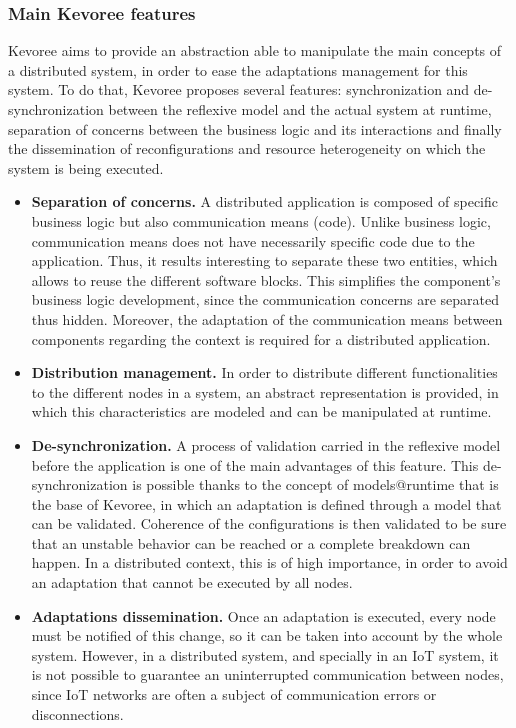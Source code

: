 \subsubsection{Main Kevoree features}
Kevoree aims to provide an abstraction able to manipulate the main concepts of a distributed system, in order to ease the adaptations management for this system.
To do that, Kevoree proposes several features: synchronization and de-synchronization between the reflexive model and the actual system at runtime, separation of concerns between the business logic and its interactions and finally the dissemination of reconfigurations and resource heterogeneity on which the system is being executed.
\begin{itemize}
	\item \textbf{Separation of concerns.} A distributed application is composed of specific business logic but also communication means (code).
	Unlike business logic, communication means does not have necessarily specific code due to the application.
	Thus, it results interesting to separate these two entities, which allows to reuse the different software blocks.
	This simplifies the component's business logic development, since the communication concerns are separated thus hidden.
	Moreover, the adaptation of the communication means between components regarding the context is required for a distributed application.
	\item \textbf{Distribution management.} In order to distribute different functionalities to the different nodes in a system, an abstract representation is provided, in which this characteristics are modeled and can be manipulated at runtime.
	\item \textbf{De-synchronization.} A process of validation carried in the reflexive model before the application is one of the main advantages of this feature.
	This de-synchronization is possible thanks to the concept of models@runtime that is the base of Kevoree, in which an adaptation is defined through a model that can be validated.
	Coherence of the configurations is then validated to be sure that an unstable behavior can be reached or a complete breakdown can happen.
	In a distributed context, this is of high importance, in order to avoid an adaptation that cannot be executed by all nodes.
	\item \textbf{Adaptations dissemination.} Once an adaptation is executed, every node must be notified of this change, so it can be taken into account by the whole system.
	However, in a distributed system, and specially in an IoT system, it is not possible to guarantee an uninterrupted communication between nodes, since IoT networks are often a subject of communication errors or disconnections.

\end{itemize}
